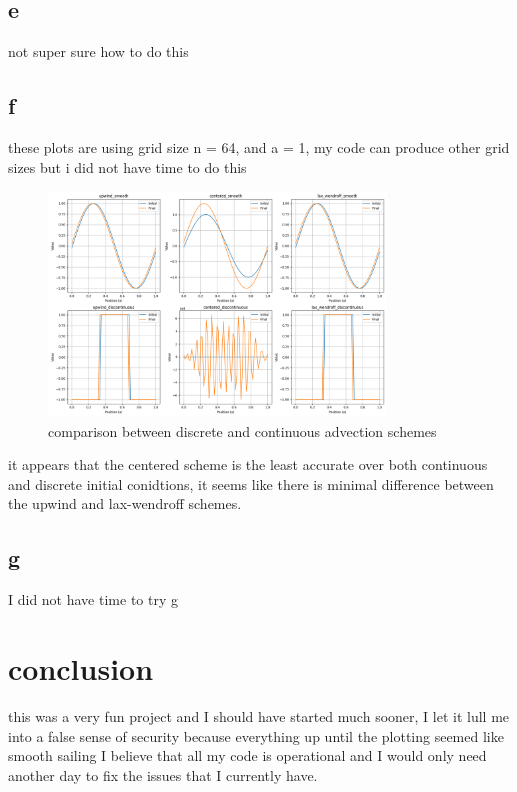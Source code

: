 \documentclass{article}
\begin{document}
\subsection*{e}
not super sure how to do this

\newpage

\subsection*{f}
    these plots are using grid size n = 64, and a = 1, my code can produce other grid sizes but i did not have time to do this
    \begin{figure}[htbp]
        \centering
        \includegraphics[width=0.8\textwidth]{../code/figures/advection_comparison.png}
        \caption{comparison between discrete and continuous advection schemes}
        \label{fig: solutions.png}
    \end{figure}

    \FloatBarrier
    it appears that the centered scheme is the least accurate over both continuous and discrete initial conidtions, it seems like there is minimal difference
    between the upwind and lax-wendroff schemes. 

\subsection*{g}
I did not have time to try g

\section*{conclusion}
this was a very fun project and I should have started much sooner, I let it lull me into a false sense of security because everything up until the plotting seemed like smooth sailing
I believe that all my code is operational and I would only need another day to fix the issues that I currently have. 
\end{document}
